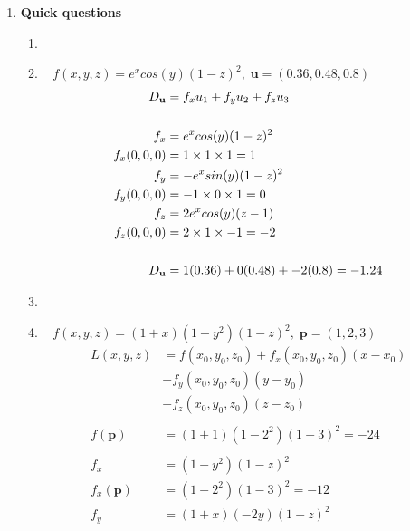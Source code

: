 \documentclass[11pt]{article}
\newcommand\Item[1][]{%
  \ifx\relax#1\relax  \item \else \item[#1] \fi
  \abovedisplayskip=0pt\abovedisplayshortskip=0pt~\vspace*{-\baselineskip}}
\begin{document}
\begin{preview}
\begin{enumerate}
          \newpage
    \item \textbf{Quick questions}
          \begin{enumerate}
              \Item
              $f(x,y,z) = e^{x}cos(y)(1-z)^{2}, \; \textbf{u} = (0.36, 0.48, 0.8)$ \\
              \begin{align*}
                  D_{\textbf{\textbf{u}}} & = f_{x}u_{1} + f_{y}u_{2} + f_{z}u_{3} \\ \\
                  f_{x}                   & = e^{x}cos(y)(1-z)^{2}                 \\
                  f_{x}(0,0,0)            & = 1 \times 1 \times 1 = 1              \\
                  f_{y}                   & = -e^{x}sin(y)(1-z)^2                  \\
                  f_{y}(0,0,0)            & = -1 \times 0 \times 1 = 0             \\
                  f_{z}                   & = 2e^{x}cos(y)(z - 1)                  \\
                  f_{z}(0,0,0)            & = 2 \times 1 \times -1 = -2            \\ \\
                  D_{\textbf{\textbf{u}}} & = 1(0.36) + 0(0.48) + -2(0.8)=-1.24    \\
              \end{align*}
              \Item
              $f(x,y,z) = (1+x)(1-y^2)(1-z)^2, \; \textbf{p} = (1,2,3) $\\
              \begin{align*}
                  L(x,y,z)          & = f(x_0, y_0, z_0) + f_x(x_0, y_0, z_0)(x-x_0) \\
                                    & + f_y(x_0, y_0, z_0)(y-y_0)                    \\
                                    & + f_z(x_0, y_0, z_0)(z-z_0)                    \\\\
                  f(\textbf{p})     & = (1+1)(1-2^2)(1-3)^2=-24                      \\ \\
                  f_{x}             & = (1-y^2)(1-z)^2                               \\
                  f_{x}(\textbf{p}) & = (1-2^2)(1-3)^2=-12                           \\
                  f_{y}             & = (1+x)(-2y)(1-z)^2                            \\

\end{align*}
\end{enumerate}
\end{enumerate}
\end{preview}
\end{document}
